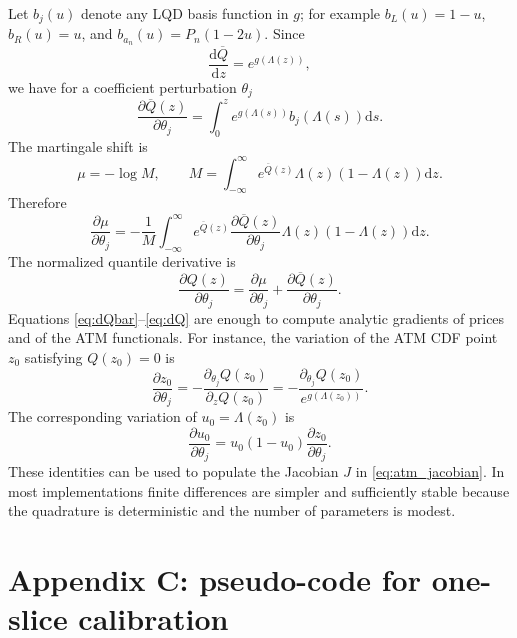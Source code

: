 \documentclass[11pt]{article}
\newcommand{\dd}{\mathrm{d}}
\newcommand{\1}{\mathbf{1}}
\begin{document}
Let $b_j(u)$ denote any LQD basis function in $g$; for example $b_L(u)=1-u$, $b_R(u)=u$, and $b_{a_n}(u)=P_n(1-2u)$.  Since
\begin{equation}
    \frac{\dd \overline Q}{\dd z}=e^{g(\Lambda(z))},
\end{equation}
we have for a coefficient perturbation $\theta_j$
\begin{equation}
    \frac{\partial \overline Q(z)}{\partial\theta_j}
    =\int_0^z e^{g(\Lambda(s))}b_j(\Lambda(s))\dd s.\label{eq:dQbar}
\end{equation}
The martingale shift is
\begin{equation}
    \mu=-\log M,
    \qquad
    M=\int_{-\infty}^{\infty}e^{\overline Q(z)}\Lambda(z)(1-\Lambda(z))\dd z.
\end{equation}
Therefore
\begin{equation}
    \frac{\partial\mu}{\partial\theta_j}
    =-\frac{1}{M}\int_{-\infty}^{\infty}e^{\overline Q(z)}
      \frac{\partial\overline Q(z)}{\partial\theta_j}
      \Lambda(z)(1-\Lambda(z))\dd z.\label{eq:dmu}
\end{equation}
The normalized quantile derivative is
\begin{equation}
    \frac{\partial Q(z)}{\partial\theta_j}
    =\frac{\partial\mu}{\partial\theta_j}
    +\frac{\partial\overline Q(z)}{\partial\theta_j}.\label{eq:dQ}
\end{equation}
Equations \eqref{eq:dQbar}--\eqref{eq:dQ} are enough to compute analytic gradients of prices and of the ATM functionals.  For instance, the variation of the ATM CDF point $z_0$ satisfying $Q(z_0)=0$ is
\begin{equation}
    \frac{\partial z_0}{\partial\theta_j}
    =-\frac{\partial_{\theta_j}Q(z_0)}{\partial_zQ(z_0)}
    =-\frac{\partial_{\theta_j}Q(z_0)}{e^{g(\Lambda(z_0))}}.
\end{equation}
The corresponding variation of $u_0=\Lambda(z_0)$ is
\begin{equation}
    \frac{\partial u_0}{\partial\theta_j}=u_0(1-u_0)\frac{\partial z_0}{\partial\theta_j}.
\end{equation}
These identities can be used to populate the Jacobian $J$ in \eqref{eq:atm_jacobian}.  In most implementations finite differences are simpler and sufficiently stable because the quadrature is deterministic and the number of parameters is modest.

\section{Appendix C: pseudo-code for one-slice calibration}
\end{document}

